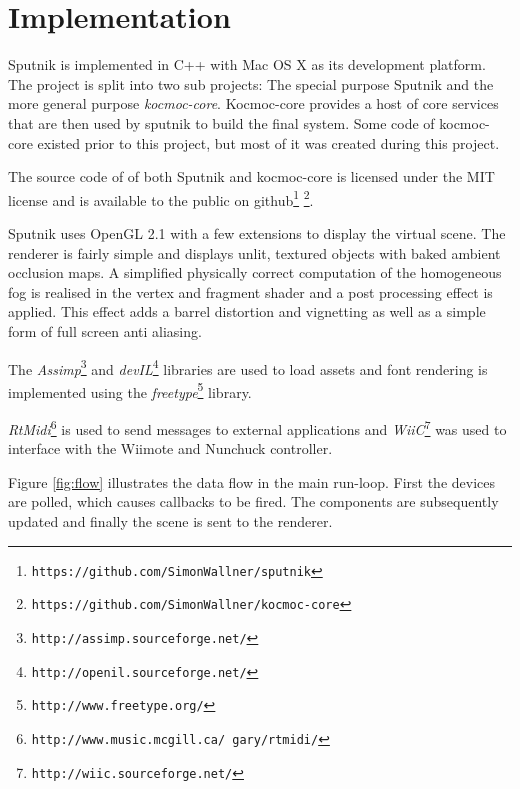 \documentclass[10pt,a4paper]{scrartcl}
\begin{document}
\section{Implementation}
Sputnik is implemented in C++ with Mac OS X as its development platform. The project is split into two sub projects: The special purpose Sputnik and the more general purpose \emph{kocmoc-core}. Kocmoc-core provides a host of core services that are then used by sputnik to build the final system. Some code of kocmoc-core existed prior to this project, but most of it was created during this project. 

The source code of of both Sputnik and kocmoc-core is licensed under the MIT license and is available to the public on github\footnote{\texttt{https://github.com/SimonWallner/sputnik}} \footnote{\texttt{https://github.com/SimonWallner/kocmoc-core}}.

Sputnik uses OpenGL 2.1 with a few extensions to display the virtual scene. The renderer is fairly simple and displays unlit, textured objects with baked ambient occlusion maps. A simplified physically correct computation of the homogeneous fog is realised in the vertex and fragment shader and a post processing effect is applied. This effect adds a barrel distortion and vignetting as well as a simple form of full screen anti aliasing.

The \emph{Assimp}\footnote{\texttt{http://assimp.sourceforge.net/}} and \emph{devIL}\footnote{\texttt{http://openil.sourceforge.net/}} libraries are used to load assets and font rendering is implemented using the \emph{freetype}\footnote{\texttt{http://www.freetype.org/}} library.

\emph{RtMidi}\footnote{\texttt{http://www.music.mcgill.ca/~gary/rtmidi/}} is used to send messages to external applications and \emph{WiiC}\footnote{\texttt{http://wiic.sourceforge.net/}} was used to interface with the Wiimote and Nunchuck controller.

Figure \ref{fig:flow} illustrates the data flow in the main run-loop. First the devices are polled, which causes callbacks to be fired. The components are subsequently updated and finally the scene is sent to the renderer.
\end{document}
